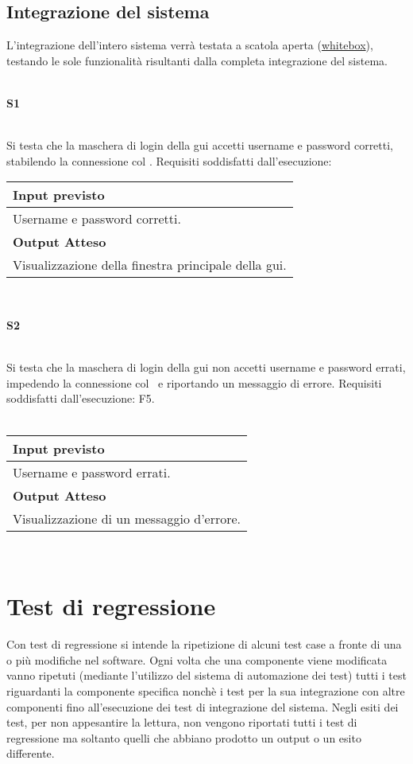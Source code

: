 \subsection{Integrazione del sistema}
L'integrazione dell'intero sistema verr\`a testata a scatola aperta (\underline{whitebox}), testando le sole funzionalit\`a risultanti dalla completa integrazione del sistema.\\
 \\
\begin{Large}\textbf{S1}\end{Large} \\
Si testa che la maschera di login della gui accetti username e password corretti, stabilendo la connessione col \rp.
Requisiti soddisfatti dall'esecuzione: \\
\begin{center}
\begin{tabular}{|p{11cm}|} \hline
\textbf{Input previsto}\\ \hline
Username e password corretti.\\ \hline
\textbf{Output Atteso}\\ \hline
Visualizzazione della finestra principale della gui.\\ \hline
\end{tabular} \\
\end{center}

\begin{Large}\textbf{S2}\end{Large} \\
Si testa che la maschera di login della gui  non accetti username e password errati, impedendo la connessione col \rp\ e riportando un messaggio di errore.
Requisiti soddisfatti dall'esecuzione: F5. \\
 \\
\begin{center}
\begin{tabular}{|p{11cm}|} \hline
\textbf{Input previsto}\\ \hline
Username e password errati.\\ \hline
\textbf{Output Atteso}\\ \hline
Visualizzazione di un messaggio d'errore.\\ \hline
\end{tabular} \\
\end{center}

\section{Test di regressione}
Con test di regressione si intende la ripetizione di alcuni test case a fronte di una o pi\`u modifiche nel software. Ogni volta che una componente viene modificata vanno ripetuti (mediante l'utilizzo del sistema di automazione dei test) tutti i test riguardanti la componente specifica nonch\`e i test per la sua integrazione con altre componenti fino all'esecuzione dei test di integrazione del sistema.
Negli esiti dei test, per non appesantire la lettura, non vengono riportati tutti i test di regressione ma soltanto quelli che abbiano prodotto un output o un esito differente.

